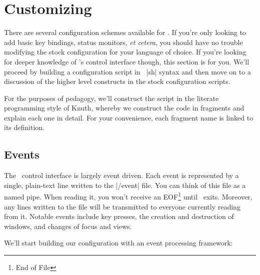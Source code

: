 \chapter{Customizing \wmii}

There are several configuration schemes available for \wmii. If
you're only looking to add basic key bindings, status monitors,
\emph{et cetera}, you should have no trouble modifying the stock
configuration for your language of choice. If you're looking for
deeper knowledge of \wmii's control interface though, this
section is for you. We'll proceed by building a configuration
script in \POSIX\ |sh| syntax and then move on to a discussion
of the higher level constructs in the stock configuration
scripts.

For the purposes of pedagogy, we'll construct the script in the
literate programming style of Knuth, whereby we construct the
code in fragments and explain each one in detail. For your
convenience, each fragment name is linked to its definition.

\section{Events}

The \wmii\ control interface is largely event driven. Each event
is represented by a single, plain-text line written to the
|/event| file. You can think of this file as a named pipe. When
reading it, you won't receive an EOF\footnote{End of File} until
\wmii\ exits. Moreover, any lines written to the file will be
transmitted to everyone currently reading from it. Notable
events include key presses, the creation and destruction of
windows, and changes of focus and views.

We'll start building our configuration with an event processing
framework:


